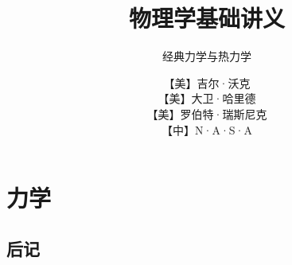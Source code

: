 \documentclass[themecolor=brown]{textbook-cn}%
\title{物理学基础讲义}
\subtitle{经典力学与热力学}
\author{【美】吉尔·沃克\\【美】大卫·哈里德\\【美】罗伯特·瑞斯尼克\\【中】N·A·S·A}
\begin{document}
\MainFont


\maketitle

\lipsum[1-6]



\frontmatter
\lipsum


\shorttableofcontents
\tableofcontents

\listoffigures
%
\mainmatter


\partintro{\lipsum[2]}
\part{力学}



%

%

%
%
%
%
%
%
%
%
%
%
%
%
%


\backmatter

%	

\chapter{后记}

\lipsum

%
\end{document}
